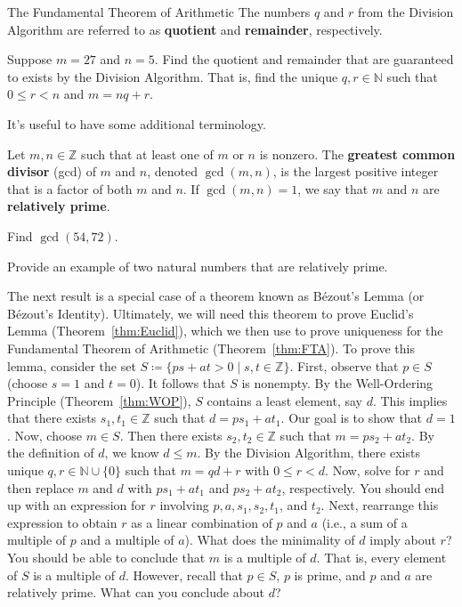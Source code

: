 \begin{section}{The Fundamental Theorem of Arithmetic}
The numbers $q$ and $r$ from the Division Algorithm are referred to as \textbf{quotient} and \textbf{remainder}, respectively.

\begin{problem}
Suppose $m=27$ and $n=5$. Find the quotient and remainder that are guaranteed to exists by the Division Algorithm.  That is, find the unique $q,r\in\mathbb{N}$ such that $0\leq r<n$ and $m=nq+r$.
\end{problem}

It's useful to have some additional terminology.

\begin{definition}
Let $m,n\in\mathbb{Z}$ such that at least one of $m$ or $n$ is nonzero.  The \textbf{greatest common divisor} (gcd) of $m$ and $n$, denoted $\boxed{\gcd(m,n)}$, is the largest positive integer that is a factor of both $m$ and $n$. If $\gcd(m,n)=1$, we say that $m$ and $n$ are \textbf{relatively prime}.
\end{definition}

\begin{problem}
Find $\gcd(54,72)$.
\end{problem}

\begin{problem}
Provide an example of two natural numbers that are relatively prime.
\end{problem}

The next result is a special case of a theorem known as B\'ezout's Lemma (or B\'ezout's Identity). Ultimately, we will need this theorem to prove Euclid's Lemma (Theorem~\ref{thm:Euclid}), which we then use to prove uniqueness for the Fundamental Theorem of Arithmetic (Theorem~\ref{thm:FTA}). To prove this lemma, consider the set $S\coloneqq \{ps+at> 0\mid s,t\in \mathbb{Z}\}$. First, observe that $p\in S$ (choose $s=1$ and $t=0$). It follows that $S$ is nonempty. By the Well-Ordering Principle (Theorem~\ref{thm:WOP}), $S$ contains a least element, say $d$. This implies that there exists $s_1,t_1\in \mathbb{Z}$ such that $d=ps_1+at_1$. Our goal is to show that $d=1$. Now, choose $m\in S$. Then there exists $s_2,t_2\in \mathbb{Z}$ such that $m=ps_2+at_2$. By the definition of $d$, we know $d\leq m$. By the Division Algorithm, there exists unique $q,r\in \mathbb{N}\cup\{0\}$ such that $m=qd+r$ with $0\leq r < d$. Now, solve for $r$ and then replace $m$ and $d$ with $ps_1+at_1$ and $ps_2+at_2$, respectively.  You should end up with an expression for $r$ involving $p, a, s_1, s_2, t_1$, and $t_2$.  Next, rearrange this expression to obtain $r$ as a linear combination of $p$ and $a$ (i.e., a sum of a multiple of $p$ and a multiple of $a$). What does the minimality of $d$ imply about $r$?  You should be able to conclude that $m$ is a multiple of $d$.  That is, every element of $S$ is a multiple of $d$.  However, recall that $p\in S$, $p$ is prime, and $p$ and $a$ are relatively prime.  What can you conclude about $d$?


\end{section}
